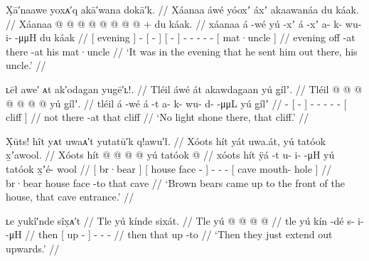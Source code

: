 \ex\label{ex:91-99-evening-ordered-uncle-out}%
%
\begingl
	\glpreamble	X̣ā′naawe yoxᴀ′q akā′wana dokā′k. //
	\glpreamble	Xáanaa áwé yóoxʼ áxʼ akaawanáa du káak. //
	\gla	{} Xáanaa {}  @ {}
		{}  @ {} {} {}  @ {} {}
		 @ {} @ {} @ {} @ {} @ {} +
		{} du káak. {} //
	\glb	{} xáanaa {} á -wé
		{} yú -xʼ {} {} á -xʼ {}
		a- k- wu- i-  -μμH
		{} du káak {} //
	\glc	{}[ evening {}]  -
		{}[  - {}] {}[  - {}]
		- - - -  -
		{}[  mat·uncle {}] //
	\gld	{} evening {}  {}
		{} off -at {} {} there -at {}
		 {} {} {} {} {}
		{} his mat·uncle {} //
	\glft	‘It was in the evening that he sent him out there, his uncle.’
		//
\endgl
\xe

\ex\label{ex:91-100-no-light-shone-there-that-cliff}%
%
\begingl
	\glpreamble	ʟēł awe′ ᴀt ak′odagan yugē′ʟ!. //
	\glpreamble	Tléil áwé át akawdagaan yú g̱ílʼ. //
	\gla	Tléil  @ {}
		{}  @ {} {}
		 @ {} @ {} @ {} @ {} @ {}
		{} yú g̱ílʼ. {}  //
	\glb	tléil á -wé
		{} á -t {}
		a- k- wu- d-  -μμL
		{} yú g̱ílʼ {} //
	\glc	{}  -
		{}[  - {}]
		- - - -  -
		{}[  cliff {}] //
	\gld	not  {}
		{} there -at {}
		 {} {} {} {} {}
		{} that cliff {} //
	\glft	‘No light shone there, that cliff.’
		//
\endgl
\xe

\ex\label{ex:91-101-brown-bears-come}%
%
\begingl
	\glpreamble	X̣ūts! hît yᴀt uwaᴀ′t yutatū′k q!awu′ł. //
	\glpreamble	Xóots hít yát uwa.át, yú tatóok x̱ʼawool. //
	\gla	{} Xóots {} {} hít  @ {} {}
		 @ {} @ {} @ {}
		{} yú tatóok  @ {} {} //
	\glb	{} xóots {} {} hít ÿá -t {}
		u- i-  -μH
		{} yú tatóok x̱ʼé- wool {} //
	\glc	{}[ br·bear {}] {}[ house face - {}]
		- -  -
		{}[  cave mouth- hole {}] //
	\gld	{} br·bear {} {} house face -to {}
		 {} {} {}
		{} that cave  {} {} //
	\glft	‘Brown bears came up to the front of the house, that cave entrance.’
		//
\endgl
\xe

\ex\label{ex:91-102-extend-out-upwards}%
%
\begingl
	\glpreamble	ʟe yukî′nde sîx̣ᴀ′t //
	\glpreamble	Tle yú kínde sixát. //
	\gla	Tle {} yú  @ {} {}
		 @ {} @ {} @ {} //
	\glb	tle {} yú kín -dé {}
		s- i-  -μH //
	\glc	then {}[  up - {}]
		- -  - //
	\gld	then {} that up -to {}
		 {} {} {} //
	\glft	‘Then they just extend out upwards.’
		//
\endgl
\xe

